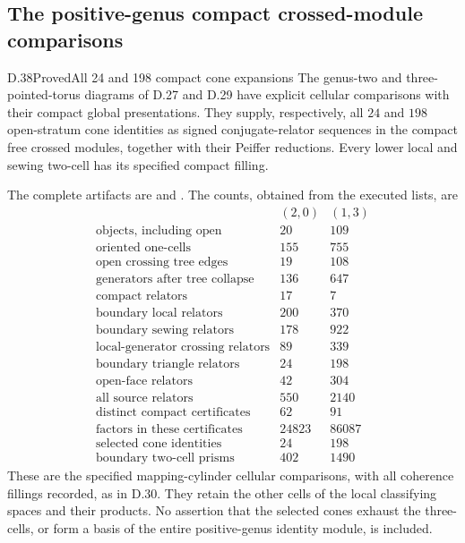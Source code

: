 \subsection{The positive-genus compact crossed-module comparisons}

\begin{result}{D.38}{Proved}{All 24 and 198 compact cone expansions}
The genus-two and three-pointed-torus diagrams of D.27 and D.29
have explicit cellular comparisons with their compact global
presentations.  They supply, respectively, all $24$ and $198$
open-stratum cone identities as signed conjugate-relator
sequences in the compact free crossed modules, together with
their Peiffer reductions.  Every lower local and sewing
two-cell has its specified compact filling.

The complete artifacts are
 and
.
The counts, obtained from the executed lists, are
\[
\begin{array}{l|rr}
 & (2,0)&(1,3)\\\hline
\text{objects, including open}&20&109\\
\text{oriented one-cells}&155&755\\
\text{open crossing tree edges}&19&108\\
\text{generators after tree collapse}&136&647\\
\text{compact relators}&17&7\\
\text{boundary local relators}&200&370\\
\text{boundary sewing relators}&178&922\\
\text{local-generator crossing relators}&89&339\\
\text{boundary triangle relators}&24&198\\
\text{open-face relators}&42&304\\
\text{all source relators}&550&2140\\
\text{distinct compact certificates}&62&91\\
\text{factors in these certificates}&24823&86087\\
\text{selected cone identities}&24&198\\
\text{boundary two-cell prisms}&402&1490
\end{array}                                                     \tag{D.79}
\]
These are the specified mapping-cylinder cellular comparisons,
with all coherence fillings recorded, as in D.30.  They retain
the other cells of the local classifying spaces and their products.
No assertion that the selected cones exhaust the three-cells,
or form a basis of the entire positive-genus identity module,
is included.
\end{result}
